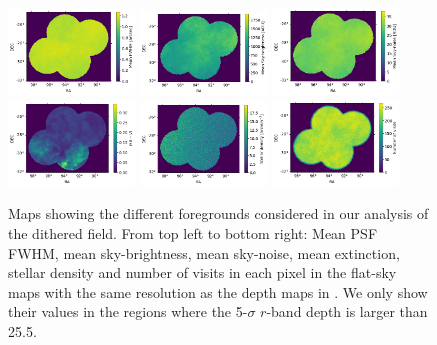 \documentclass[\docopts]{\docclass}
\begin{document}
\begin{figure}
\centering
\includegraphics[width=0.30\textwidth]{mean_fwhm.png}
\includegraphics[width=0.30\textwidth]{mean_sky.png}
\includegraphics[width=0.30\textwidth]{mean_skynoise.png}
\includegraphics[width=0.30\textwidth]{extinction.png}
\includegraphics[width=0.30\textwidth]{stellar_density.png}
\includegraphics[width=0.30\textwidth]{nvisits.png}
\caption{Maps showing the different foregrounds considered in our analysis of the dithered field. From top left to bottom right: Mean PSF FWHM, mean sky-brightness, mean sky-noise, mean extinction, stellar density and number of visits in each pixel in the flat-sky maps with the same resolution as the depth maps in . We only show their values in the regions where the 5-$\sigma$ $r$-band depth is larger than 25.5.}
\label{fig:systematic_maps}
\end{figure}
\end{document}
